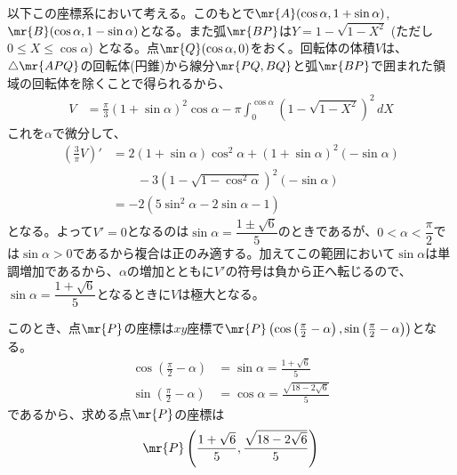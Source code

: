 以下この座標系において考える。このもとで$\mr{A}(\cos\alpha, 1+\sin\alpha)$, $\mr{B}(\cos\alpha, 1-\sin\alpha)$となる。また弧$\mr{BP}$は$Y=1-\sqrt{1-X^2}$ (ただし$0\le X\le \cos\alpha$) となる。点$\mr{Q}(\cos\alpha, 0)$をおく。回転体の体積$V$は、$\triangle\mr{APQ}$の回転体(円錐)から線分$\mr{PQ, BQ}$と弧$\mr{BP}$で囲まれた領域の回転体を除くことで得られるから、
\begin{align*}
 V&=\frac{\pi}{3}(1+\sin\alpha)^2\cos\alpha-\pi\int_0^{\cos\alpha}\!(1-\sqrt{1-X^2})^2 \,dX
\end{align*}
これを$\alpha$で微分して、
\begin{align*}
 \left(\frac{3}{\pi}V\right)'&=2(1+\sin\alpha)\cos^2\alpha+(1+\sin\alpha)^2(-\sin\alpha) \\
 &\qquad -3(1-\sqrt{1-\cos^2\alpha})^2(-\sin\alpha) \\
 &=-2(5\sin^2\alpha-2\sin\alpha-1)
\end{align*}
となる。よって$V'=0$となるのは$\sin\alpha=\dfrac{1\pm\sqrt{6}}{5}$のときであるが、$0<\alpha<\dfrac{\pi}{2}$では$\sin\alpha>0$であるから複合は正のみ適する。加えてこの範囲において$\sin\alpha$は単調増加であるから、$\alpha$の増加とともに$V'$の符号は負から正へ転じるので、$\sin\alpha=\dfrac{1+\sqrt{6}}{5}$となるときに$V$は極大となる。

このとき、点$\mr{P}$の座標は$xy$座標で$\mr{P}\left(\cos\left(\frac{\pi}{2}-\alpha\right), \sin\left(\frac{\pi}{2}-\alpha\right)\right)$となる。
\begin{align*}
 \cos\left(\frac{\pi}{2}-\alpha\right)&=\sin\alpha=\frac{1+\sqrt{6}}{5} \\
 \sin\left(\frac{\pi}{2}-\alpha\right)&=\cos\alpha=\frac{\sqrt{18-2\sqrt{6}}}{5}
\end{align*}
であるから、求める点$\mr{P}$の座標は
\[ \mr{P}\left(\frac{1+\sqrt{6}}{5}, \frac{\sqrt{18-2\sqrt{6}}}{5}\right) \]
